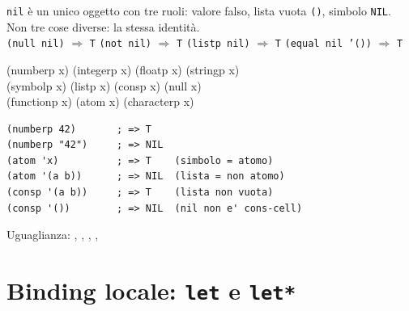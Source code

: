 \begin{intuizione}
\texttt{nil} è un unico oggetto con tre ruoli: valore falso,
lista vuota \texttt{()}, simbolo \texttt{NIL}.
Non tre cose diverse: la stessa identità.\\[4pt]
\texttt{(null nil)} $\Rightarrow$ \texttt{T} \quad
\texttt{(not nil)} $\Rightarrow$ \texttt{T} \quad
\texttt{(listp nil)} $\Rightarrow$ \texttt{T} \quad
\texttt{(equal nil '())} $\Rightarrow$ \texttt{T}
\end{intuizione}

\seprule


\begin{sintassi}
(numberp x)   (integerp x)   (floatp x)    (stringp x)\\
(symbolp x)   (listp x)      (consp x)     (null x)\\
(functionp x) (atom x)       (characterp x)
\end{sintassi}

\begin{esempio}
\begin{lstlisting}
(numberp 42)       ; => T
(numberp "42")     ; => NIL
(atom 'x)          ; => T    (simbolo = atomo)
(atom '(a b))      ; => NIL  (lista = non atomo)
(consp '(a b))     ; => T    (lista non vuota)
(consp '())        ; => NIL  (nil non e' cons-cell)
\end{lstlisting}
\end{esempio}

\begin{concetto}{Uguaglianza: \fnt{=}, , , , }

\boxsep
{}
\end{concetto}

\section{Binding locale: \texttt{let} e \texttt{let*}}

